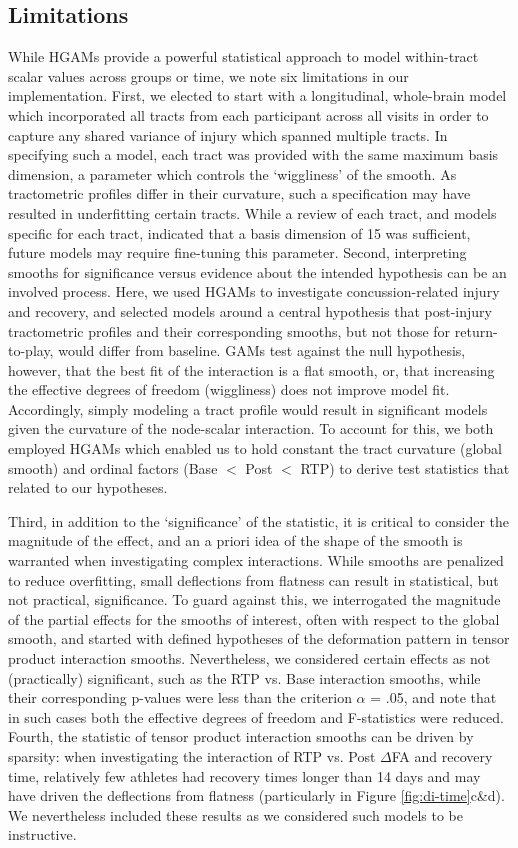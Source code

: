 \documentclass[12pt]{article}
\begin{document}
\subsection{Limitations}
\label{ssec:disc-limit}
While HGAMs provide a powerful statistical approach to model within-tract scalar values across groups or time, we note six limitations in our implementation. First, we elected to start with a longitudinal, whole-brain model which incorporated all tracts from each participant across all visits in order to capture any shared variance of injury which spanned multiple tracts. In specifying such a model, each tract was provided with the same maximum basis dimension, a parameter which controls the `wiggliness' of the smooth. As tractometric profiles differ in their curvature, such a specification may have resulted in underfitting certain tracts. While a review of each tract, and models specific for each tract, indicated that a basis dimension of 15 was sufficient, future models may require fine-tuning this parameter. Second, interpreting smooths for significance versus evidence about the intended hypothesis can be an involved process. Here, we used HGAMs to investigate concussion-related injury and recovery, and selected models around a central hypothesis that post-injury tractometric profiles and their corresponding smooths, but not those for return-to-play, would differ from baseline. GAMs test against the null hypothesis, however, that the best fit of the interaction is a flat smooth, or, that increasing the effective degrees of freedom (wiggliness) does not improve model fit. Accordingly, simply modeling a tract profile would result in significant models given the curvature of the node-scalar interaction. To account for this, we both employed HGAMs which enabled us to hold constant the tract curvature (global smooth) and ordinal factors (Base $<$ Post $<$ RTP) to derive test statistics that related to our hypotheses.

Third, in addition to the `significance' of the statistic, it is critical to consider the magnitude of the effect, and an a priori idea of the shape of the smooth is warranted when investigating complex interactions. While smooths are penalized to reduce overfitting, small deflections from flatness can result in statistical, but not practical, significance. To guard against this, we interrogated the magnitude of the partial effects for the smooths of interest, often with respect to the global smooth, and started with defined hypotheses of the deformation pattern in tensor product interaction smooths. Nevertheless, we considered certain effects as not (practically) significant, such as the RTP vs. Base interaction smooths, while their corresponding p-values were less than the criterion $\alpha$ = .05, and note that in such cases both the effective degrees of freedom and F-statistics were reduced. Fourth, the statistic of tensor product interaction smooths can be driven by sparsity: when investigating the interaction of RTP vs. Post $\Delta$FA and recovery time, relatively few athletes had recovery times longer than 14 days and may have driven the deflections from flatness (particularly in Figure \ref{fig:di-time}c\&d). We nevertheless included these results as we considered such models to be instructive.
\end{document}

